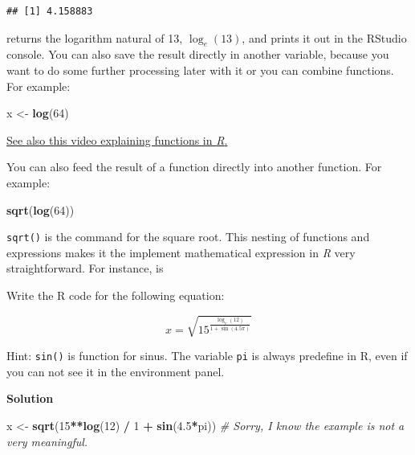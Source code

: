 \documentclass[
]{scrartcl}
\makeatletter
\newenvironment{Shaded}{\begin{snugshade}}{\end{snugshade}}
\newcommand{\CommentTok}[1]{\textcolor[rgb]{0.56,0.35,0.01}{\textit{#1}}}
\newcommand{\DecValTok}[1]{\textcolor[rgb]{0.00,0.00,0.81}{#1}}
\newcommand{\FloatTok}[1]{\textcolor[rgb]{0.00,0.00,0.81}{#1}}
\newcommand{\KeywordTok}[1]{\textcolor[rgb]{0.13,0.29,0.53}{\textbf{#1}}}
\newcommand{\NormalTok}[1]{#1}
\newcommand{\OperatorTok}[1]{\textcolor[rgb]{0.81,0.36,0.00}{\textbf{#1}}}
\newcommand{\StringTok}[1]{\textcolor[rgb]{0.31,0.60,0.02}{#1}}
\newenvironment{kframe}{%
\medskip{}
\setlength{\fboxsep}{.8em}
 \def\at@end@of@kframe{}%
 \ifinner\ifhmode%
  \def\at@end@of@kframe{\end{minipage}}%
  \begin{minipage}{\columnwidth}%
 \fi\fi%
 \def\FrameCommand##1{\hskip\@totalleftmargin \hskip-\fboxsep
 \colorbox{shadecolor}{##1}\hskip-\fboxsep
     \hskip-\linewidth \hskip-\@totalleftmargin \hskip\columnwidth}%
 \MakeFramed {\advance\hsize-\width
   \@totalleftmargin\z@ \linewidth\hsize
   \@setminipage}}%
 {\par\unskip\endMakeFramed%
 \at@end@of@kframe}
\newenvironment{rmdblock}[1]
  {
  \begin{itemize}
  \renewcommand{\labelitemi}{
    \raisebox{-.7\height}[0pt][0pt]{
      {\setkeys{Gin}{width=3em,keepaspectratio}\texttt{[image: images/\#1]}}
    }
  }
  \setlength{\fboxsep}{1em}
  \begin{kframe}
  \item
  }
  {
  \end{kframe}
  \end{itemize}
  }
\newenvironment{simple}
        {}
        {}
\newenvironment{myexercise}
    {\begin{rmdblock}{exercise_green}}
    {\end{rmdblock}}
\newenvironment{webexsolution}[1]
    {\par\tiny\textbf{#1}}
    {\par}
\newcommand{\webexhide}[1]{\begin{webexsolution}{#1}}
\makeatother
\begin{document}
\begin{verbatim}
## [1] 4.158883
\end{verbatim}

returns the logarithm natural of 13, \(\log_e(13)\), and prints it out in the RStudio console. You can also save the result directly in another variable, because you want to do some further processing later with it or you can combine functions. For example:

\begin{Shaded}
\begin{Highlighting}[]
\NormalTok{x \textless{}{-}}\StringTok{ }\KeywordTok{log}\NormalTok{(}\DecValTok{64}\NormalTok{)}
\end{Highlighting}
\end{Shaded}

\begin{simple}
\href{https://vimeo.com/220490105}{See also this video explaining
functions in \emph{R}.}
\end{simple}

You can also feed the result of a function directly into another function. For example:

\begin{Shaded}
\begin{Highlighting}[]
\KeywordTok{sqrt}\NormalTok{(}\KeywordTok{log}\NormalTok{(}\DecValTok{64}\NormalTok{))}
\end{Highlighting}
\end{Shaded}

\texttt{sqrt()} is the command for the square root. This nesting of functions and expressions makes it the implement mathematical expression in \emph{R} very straightforward. For instance, is

\begin{myexercise}
Write the R code for the following equation:

\[x = \sqrt{15^\frac{\log_e(12)}{1+ \sin(4.5 \pi)}}\]

Hint: \texttt{sin()} is function for sinus. The variable \texttt{pi} is
always predefine in R, even if you can not see it in the environment
panel.
\end{myexercise}
\webexhide{Solution}

\begin{Shaded}
\begin{Highlighting}[]
\NormalTok{x \textless{}{-}}\StringTok{ }\KeywordTok{sqrt}\NormalTok{(}\DecValTok{15}\OperatorTok{**}\KeywordTok{log}\NormalTok{(}\DecValTok{12}\NormalTok{) }\OperatorTok{/}\StringTok{ }\DecValTok{1} \OperatorTok{+}\StringTok{ }\KeywordTok{sin}\NormalTok{(}\FloatTok{4.5}\OperatorTok{*}\NormalTok{pi))}
\CommentTok{\# Sorry, I know the example is not a very meaningful.}
\end{Highlighting}
\end{Shaded}
\end{document}
